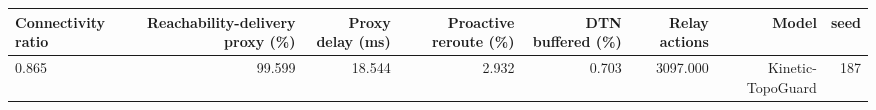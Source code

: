 \begin{tabular}{lrrrrrrr}
\toprule
Connectivity ratio & Reachability-delivery proxy (\%) & Proxy delay (ms) & Proactive reroute (\%) & DTN buffered (\%) & Relay actions & Model & seed \\
\midrule
0.865 & 99.599 & 18.544 & 2.932 & 0.703 & 3097.000 & Kinetic-TopoGuard & 187 \\
\bottomrule
\end{tabular}